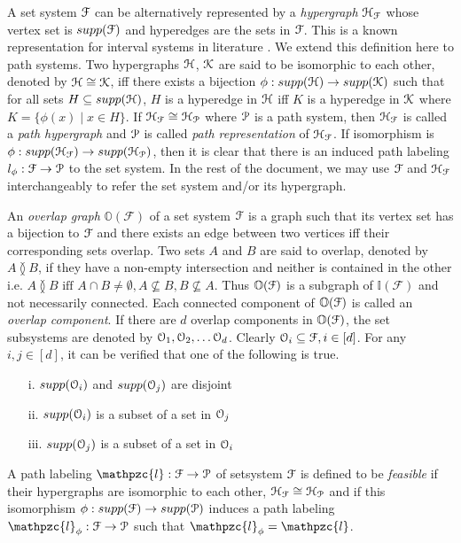 \documentclass[a4paper,UKenglish,numberwithinsect]{lipics}
\def\cF{{\cal F}}
\def\cH{{\cal H}}
\def\cK{{\cal K}}
\def\cO{{\cal O}}
\def\cP{{\cal P}}
\def\F{{\mathcal F}}
\def\H{{\mathcal H}}
\def\bI{\mathbb I}
\def\bO{\mathbb O}
\def\cl{\mathpzc{l}}
\def\overlap{\between}
\begin{document}
\noindent
A set system $\cF$ can be alternatively represented by a {\em
  hypergraph} $\H_\cF$ whose vertex set is $supp(\cF)$ and hyperedges
are the sets in $\cF$. This is a known representation for interval
systems in literature \cite{bls99}.  We extend this definition here to
path systems.  Two hypergraphs $\cH$, $\cK$ are said to be isomorphic
to each other, denoted by $\cH \cong \cK$, iff there exists a
bijection $\phi: supp(\cH) \rightarrow supp(\cK)$ such that for all
sets $H \subseteq supp(\cH)$, $H$ is a hyperedge in $\cH$ iff $K$ is a
hyperedge in $\cK$ where $K = \{\phi(x) \mid x \in H\}$.  If $\H_\cF
\cong \H_\cP$ where $\cP$ is a path system, then $\H_\cF$ is
called a {\em path hypergraph}
and $\cP$ is called {\em path representation} of $\H_\cF$. If
isomorphism is $\phi: supp(\H_\cF) \rightarrow supp(\H_\cP)$, then it
is clear that there is an induced path labeling $l_\phi: \cF
\rightarrow \cP$ to the
set system. In the rest of the document, we may use $\cF$ and
$\cH_\cF$ interchangeably to refer the set system and/or its hypergraph.

\noindent
An {\em overlap graph} $\bO(\F)$ of a set system $\cF$ is a graph such
that its vertex set has a bijection to $\cF$ and there exists an edge
between two vertices iff their corresponding sets overlap. Two sets
$A$ and $B$ are said to overlap, denoted by $A \overlap B$, if they
have a non-empty intersection and neither is contained in the other
i.e. $A \overlap B \text{ iff } A \cap B \ne \emptyset, A \nsubseteq B, B
\nsubseteq A$. Thus $\bO(\cF)$ is a subgraph of $\bI(\F)$ and not
necessarily connected. Each connected component of $\bO(\cF)$ is
called an {\em overlap component}. If there are $d$ overlap components
in $\bO(\cF)$, the set subsystems are denoted by $\cO_1, \cO_2, \ldots
\cO_d$. Clearly $\cO_i \subseteq \F, i \in [d]$. For any $i, j \in [d]$,
it can be verified that one of the following is true.
\begin{enumerate}
\item[i.] $supp(\cO_i)$ and $supp(\cO_j)$ are disjoint
\item[ii.] $supp(\cO_i)$ is a subset of a set in $\cO_j$
\item[iii.] $supp(\cO_j)$ is a subset of a set in $\cO_i$
\end{enumerate}
 
\noindent
A path labeling $\cl: \cF \rightarrow \cP$ of setsystem $\cF$ is defined to be {\em
  feasible} if their hypergraphs are isomorphic to each other,
$\cH_\cF \cong \cH_\cP$ and if this isomorphism $\phi: supp(\cF)
\rightarrow supp(\cP)$ induces a path labeling $\cl_\phi: \cF
\rightarrow \cP$ such that $\cl_\phi = \cl$. 
\end{document}

